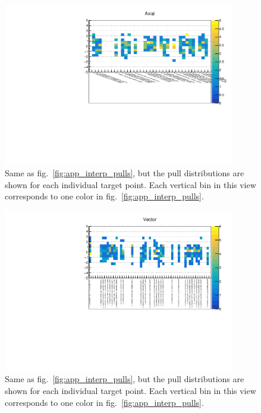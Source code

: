  \begin{figure}
   \begin{center}
	\includegraphics[width=0.9\textwidth]{figures/interpolation_appendix/Axial_pulls_per_point.pdf}
     \caption{Same as fig.~\ref{fig:app_interp_pulls}, but the pull distributions are shown for each individual target point. Each vertical bin in this view corresponds to one color in fig.~\ref{fig:app_interp_pulls}.}
     \label{fig:app_interp_pulls_per_point_axial}
   \end{center}
 \end{figure}
 
 \begin{figure}
   \begin{center}
	\includegraphics[width=0.9\textwidth]{figures/interpolation_appendix/Vector_pulls_per_point.pdf}
     \caption{Same as fig.~\ref{fig:app_interp_pulls}, but the pull distributions are shown for each individual target point. Each vertical bin in this view corresponds to one color in fig.~\ref{fig:app_interp_pulls}.}
     \label{fig:app_interp_pulls_per_point_vector}
   \end{center}
 \end{figure}

